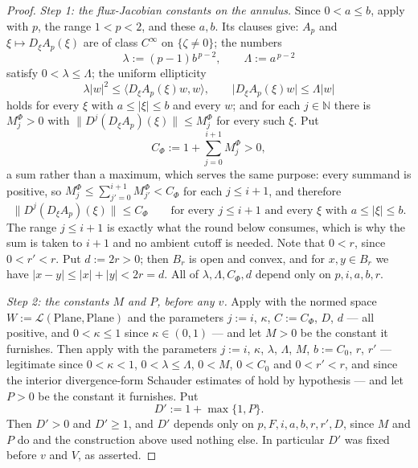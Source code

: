\begin{proof}
\emph{Step 1: the flux-Jacobian constants on the annulus.}
Since $0<a\le b$, apply  with $p$, the range $1<p<2$, and these
$a,b$.  Its clauses give: $A_p$ and $\xi\mapsto D_\xi A_p(\xi)$ are of class $C^{\infty}$ on
$\{\zeta\ne0\}$; the numbers
\[
  \lambda:=(p-1)b^{\,p-2},\qquad \Lambda:=a^{\,p-2}
\]
satisfy $0<\lambda\le\Lambda$; the uniform ellipticity
\begin{equation}\label{eq:ffbr-ell}
  \lambda\lvert w\rvert^{2}\le\bigl\langle D_\xi A_p(\xi)w,w\bigr\rangle,
  \qquad
  \bigl\lvert D_\xi A_p(\xi)w\bigr\rvert\le\Lambda\lvert w\rvert
\end{equation}
holds for every $\xi$ with $a\le\lvert\xi\rvert\le b$ and every $w$; and for each
$j\in\mathbb{N}$ there is $M_j^{\Phi}>0$ with
$\lVert D^{j}(D_\xi A_p)(\xi)\rVert\le M_j^{\Phi}$ for every such $\xi$.  Put
\[
  C_\Phi:=1+\sum_{j=0}^{i+1}M_j^{\Phi}>0 ,
\]
a sum rather than a maximum, which serves the same purpose: every summand is positive, so
$M_j^{\Phi}\le\sum_{j'=0}^{i+1}M_{j'}^{\Phi}<C_\Phi$ for each $j\le i+1$, and therefore
\begin{equation}\label{eq:ffbr-CPhi}
  \bigl\lVert D^{j}(D_\xi A_p)(\xi)\bigr\rVert\le C_\Phi
  \qquad\text{for every }j\le i+1\text{ and every }\xi\text{ with }
  a\le\lvert\xi\rvert\le b .
\end{equation}
The range $j\le i+1$ is exactly what the round below consumes, which is why the sum is taken to
$i+1$ and no ambient cutoff is needed.  Note that $0<r$, since $0<r'<r$.  Put $d:=2r>0$; then
$B_r$ is open and convex, and for $x,y\in B_r$ we have
$\lvert x-y\rvert\le\lvert x\rvert+\lvert y\rvert<2r=d$.  All of
$\lambda,\Lambda,C_\Phi,d$ depend only on $p,i,a,b,r$.

\medskip\noindent\emph{Step 2: the constants $M$ and $P$, before any $v$.}
Apply  with the normed space
$W:=\mathcal{L}(\mathrm{Plane},\mathrm{Plane})$ and the parameters $j:=i$, $\kappa$,
$C:=C_\Phi$, $D$, $d$ --- all positive, and $0<\kappa\le1$ since $\kappa\in(0,1)$ --- and let
$M>0$ be the constant it furnishes.  Then apply  with the parameters
$j:=i$, $\kappa$, $\lambda$, $\Lambda$, $M$, $b:=C_0$, $r$, $r'$ --- legitimate since
$0<\kappa<1$, $0<\lambda\le\Lambda$, $0<M$, $0<C_0$ and $0<r'<r$, and since the interior
divergence-form Schauder estimates of  hold by hypothesis --- and
let $P>0$ be the constant it furnishes.  Put
\[
  D':=1+\max\{1,P\} .
\]
Then $D'>0$ and $D'\ge1$, and $D'$ depends only on $p,F,i,a,b,r,r',D$, since $M$ and $P$ do and
the construction above used nothing else.  In particular $D'$ was fixed before $v$ and $V$, as
asserted.


\end{proof}
